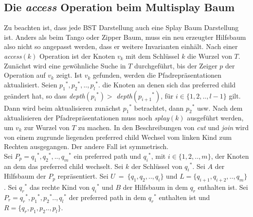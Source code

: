 \documentclass[a4paper,12pt]{article}
\begin{document}
\subsection{Die \textit{access} Operation beim Multisplay Baum}
Zu beachten ist, dass jede BST Darstellung auch eine Splay Baum Darstellung ist. Anders als beim Tango oder Zipper Baum, muss ein neu erzeugter Hilfsbaum also nicht so angepasst werden, dass er weitere Invarianten einhält.  Nach einer \textit{access}$\left(k\right)$ Operation ist der Knoten $v_k$ mit dem Schlüssel $k$ die Wurzel von $T$. Zunächst wird eine gewöhnliche Suche in $T$ durchgeführt, bis der Zeiger $p$ der Operation auf $v_k$ zeigt. Ist $v_k$ gefunden, werden die Pfadrepräsentationen aktualisiert. Seien ${p_1}^*,{p_2}^*,..,{p_l}^*.$ die Knoten an denen sich das preferred child geändert hat, so dass \textit{depth}$\left({p_i}^*\right) > $ \textit{depth}$\left({p_{i+1}}^*\right)$, für $i \in \{1, 2,..,l-1\}$ gilt. Dann wird beim aktualisieren zunächst ${p_1}^*$ betrachtet, dann ${p_2}^*$ usw. Nach dem aktualisieren der Pfadrepräsentationen muss noch \textit{splay}$\left(k\right)$ ausgeführt werden, um $v_k$ zur Wurzel von $T$ zu machen. In den Beschreibungen von \textit{cut} und \textit{join} wird von einem zugrunde liegenden preferred child Wechsel vom linken Kind zum Rechten ausgegangen. Der andere Fall ist symmetrisch.\\ 
\noindent Sei $P_p = {q_1}^*, {q_2}^*,.., {q_m}^*$ ein preferred path und ${q_i}^*$, mit $i \in \{1, 2,..,m\}$, der Knoten  an dem das preferred child wechselt. Sei $k$ der Schlüssel von ${q_i}^*$. Sei $A$ der Hilfsbaum der $P_p$ repräsentiert. Sei $U~=~\{q_1, q_2,.., q_i\}$  und $L= \{q_{i+1}, q_{i+2},..,q_m\}$.  Sei ${q_r}^*$ das rechte Kind von ${q_i}^*$ und $B$ der Hilfsbaum in dem $q_r$ enthalten ist. Sei $P_r = {q_r}^*, {p_1}^*,{p_2}^*.., {q_l}^*$ der preferred path in dem ${q_r}^*$ enthalten ist und  $R= \{ {q_r}, {p_1},{p_2}.., {p_l}\}$.
\end{document}
